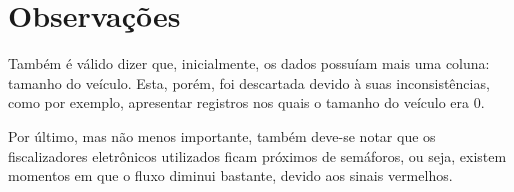 \section{Observações}


Também é válido dizer que, inicialmente, os dados possuíam mais uma coluna: tamanho do veículo. Esta, porém, foi descartada devido à suas inconsistências, como por exemplo, apresentar registros nos quais o tamanho do veículo era 0.

Por último, mas não menos importante, também deve-se notar que os fiscalizadores eletrônicos utilizados ficam próximos de semáforos, ou seja, existem momentos em que o fluxo diminui bastante, devido aos sinais vermelhos. 